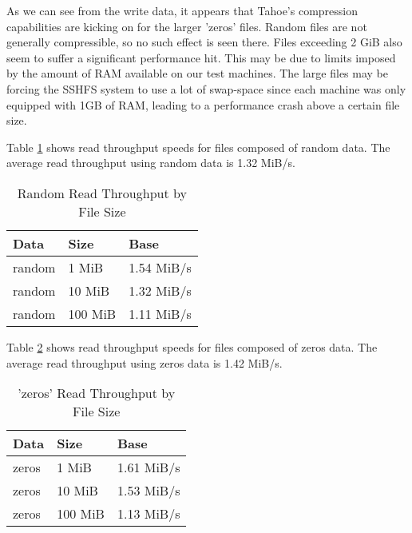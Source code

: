 \documentclass[11pt]{article}
\begin{document}
As we can see from the write data, it appears that Tahoe's compression
capabilities are kicking on for the larger 'zeros' files. Random files
are not generally compressible, so no such effect is seen there.
Files exceeding 2 GiB
also seem to suffer a significant performance hit. This may be due to
limits imposed by the amount of RAM available on our test
machines. The large files may be forcing the SSHFS system to use a lot of
swap-space since each machine was only equipped with 1GB of RAM, leading
to a performance crash above a certain file size.

Table \ref{tbl:TahoeReadRandom} shows read throughput speeds for files
composed of random data. The average read throughput using
random data is 1.32 MiB/s.

\begin{table}
  \begin{center}
    \begin{tabularx}{\textwidth}{|X|X|X|}
      \hline
      {\bf Data} & {\bf Size} & {\bf Base} \\ \hline
      random & 1 MiB & 1.54 MiB/s \\ \hline
      random & 10 MiB & 1.32 MiB/s \\ \hline
      random & 100 MiB & 1.11 MiB/s \\ \hline
    \end{tabularx}
    \caption{Random Read Throughput by File Size}
    \label{tbl:TahoeReadRandom}
  \end{center}
\end{table}

Table \ref{tbl:TahoeReadZeros} shows read throughput speeds for files
composed of zeros data. The average read throughput using
zeros data is 1.42 MiB/s.

\begin{table}
  \begin{center}
    \begin{tabularx}{\textwidth}{|X|X|X|}
      \hline
      {\bf Data} & {\bf Size} & {\bf Base} \\ \hline
      zeros & 1 MiB & 1.61 MiB/s \\ \hline
      zeros & 10 MiB & 1.53 MiB/s \\ \hline
      zeros & 100 MiB & 1.13 MiB/s \\ \hline
    \end{tabularx}
    \caption{'zeros' Read Throughput by File Size}
    \label{tbl:TahoeReadZeros}
  \end{center}
\end{table}
\end{document}
